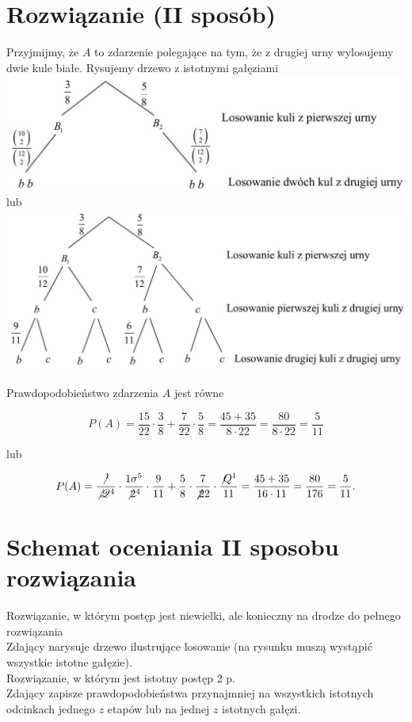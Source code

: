 \documentclass[10pt]{article}
\begin{document}
\section*{Rozwiązanie (II sposób)}
Przyjmijmy, że $A$ to zdarzenie polegające na tym, że z drugiej urny wylosujemy dwie kule białe. Rysujemy drzewo z istotnymi gałęziami\\
\includegraphics[max width=\textwidth, center]{2025_02_07_f5f4e8f37e6baab02e47g-16}\\
lub\\
\includegraphics[max width=\textwidth, center]{2025_02_07_f5f4e8f37e6baab02e47g-16(1)}

Prawdopodobieństwo zdarzenia $A$ jest równe

$$
P(A)=\frac{15}{22} \cdot \frac{3}{8}+\frac{7}{22} \cdot \frac{5}{8}=\frac{45+35}{8 \cdot 22}=\frac{80}{8 \cdot 22}=\frac{5}{11}
$$

lub

$$
P(A)=\frac{\not{ }^{1}}{\not \mathscr{Q}^{4}} \cdot \frac{1 \sigma^{5}}{\not 2^{4}} \cdot \frac{9}{11}+\frac{5}{8} \cdot \frac{7}{\not \not 22} \cdot \frac{\not Q^{1}}{11}=\frac{45+35}{16 \cdot 11}=\frac{80}{176}=\frac{5}{11} .
$$

\section*{Schemat oceniania II sposobu rozwiązania}
Rozwiązanie, w którym postęp jest niewielki, ale konieczny na drodze do pełnego rozwiązania\\
Zdający narysuje drzewo ilustrujące losowanie (na rysunku muszą wystąpić wszystkie istotne gałęzie).\\
Rozwiązanie, w którym jest istotny postęp 2 p.\\
Zdający zapisze prawdopodobieństwa przynajmniej na wszystkich istotnych odcinkach jednego $z$ etapów lub na jednej $z$ istotnych gałęzi.
\end{document}
